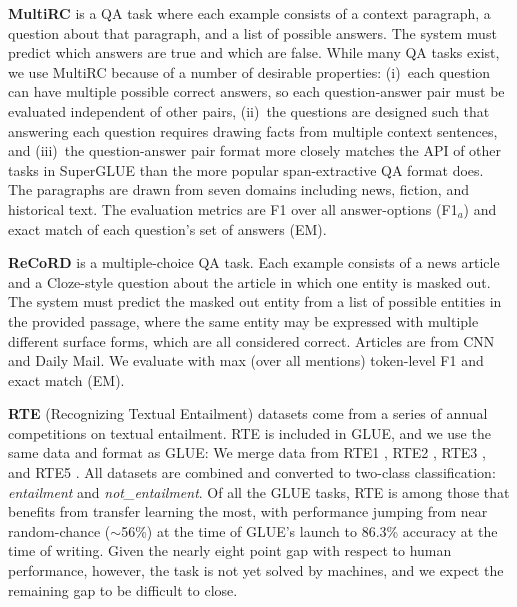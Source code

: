 \textbf{MultiRC} \citep[Multi-Sentence Reading Comprehension,][]{khashabi2018looking} is a QA task where each example consists of a context paragraph, a question about that paragraph, and a list of possible answers. The system must predict which answers are true and which are false. While many QA tasks exist, we use MultiRC because of a number of desirable properties: (i)~each question can have multiple possible correct answers, so each question-answer pair must be evaluated independent of other pairs, (ii)~the questions are designed such that answering each question requires drawing facts from multiple context sentences, and (iii)~the question-answer pair format more closely matches the API of other tasks in SuperGLUE than the more popular span-extractive QA format does.
The paragraphs are drawn from seven domains including news, fiction, and historical text.
The evaluation metrics are F1 over all answer-options (F1$_a$) and exact match of each question's set of answers (EM).

\textbf{ReCoRD} \citep[Reading Comprehension with Commonsense Reasoning Dataset,][]{zhang2018record} is a multiple-choice QA task.
Each example consists of a news article and a Cloze-style question about the article in which one entity is masked out. The system must predict the masked out entity from a list of possible entities in the provided passage, where the same entity may be expressed with multiple different surface forms, which are all considered correct.
Articles are from CNN and Daily Mail. We evaluate with max (over all mentions) token-level F1 and exact match (EM).

\textbf{RTE} (Recognizing Textual Entailment) datasets come from a series of annual competitions on textual entailment. %
RTE is included in GLUE, and we use the same data and format as GLUE: We merge data from RTE1 \citep{dagan2006pascal}, RTE2 \citep{bar2006second}, RTE3 \citep{giampiccolo2007third}, and RTE5 \citep{bentivogli2009fifth}. %
All datasets are combined and converted to two-class classification: \textit{entailment} and \textit{not\_entailment}.
Of all the GLUE tasks, RTE is among those that benefits from transfer learning the most, with performance jumping from near random-chance ($\sim$56\%) at the time of GLUE's launch to 86.3\% accuracy \citep{liu2019mt,yang2019xlnet} at the time of writing.
Given the nearly eight point gap with respect to human performance, however, the task is not yet solved by machines, and we expect the remaining gap to be difficult to close.

